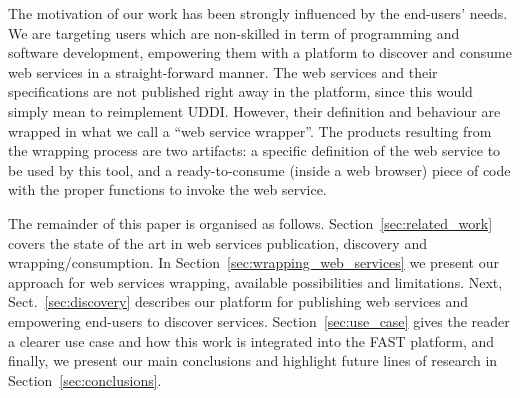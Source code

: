 The motivation of our work has been strongly influenced by the end-users' needs. We are targeting users which are non-skilled in term of programming and software development, empowering them with a platform to discover and consume web services in a straight-forward manner.
The web services and their specifications are not published right away in the platform, since this would simply mean to reimplement UDDI.
However, their definition and behaviour are wrapped in what we call a ``web service wrapper''. The products resulting from the wrapping process are two artifacts: a specific definition of the web service to be used by this tool, and a ready-to-consume (inside a web browser) piece of code with the proper functions to invoke the web service.

The remainder of this paper is organised as follows. Section~\ref{sec:related_work} covers the state of the art in web services publication, discovery and wrapping/consumption. In Section~\ref{sec:wrapping_web_services} we present our approach for web services wrapping, available possibilities and limitations. Next, Sect.~\ref{sec:discovery} describes our platform for publishing web services and empowering end-users to discover services. Section~\ref{sec:use_case} gives the reader a clearer use case and how this work is integrated into the FAST platform, and finally, we present our main conclusions and highlight future lines of research in Section~\ref{sec:conclusions}.

